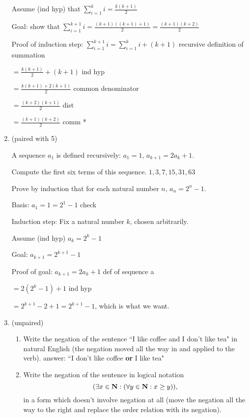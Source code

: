 \documentclass[12pt]{article}
\begin{document}
\begin{enumerate}
{Assume (ind hyp) that $\sum_{i=1}^k i = \frac{k(k+1)}2$

Goal:  show that $\sum_{i=1}^{k+1} i = \frac{(k+1)((k+1)+1)}2 = \frac{(k+1)(k+2)}2$

Proof of induction step:  $\sum_{i=1}^{k+1} i = \sum_{i=1}^{k} i +(k+1)$  recursive definition of summation

$= \frac{k(k+1)}2 + (k+1)$  ind hyp

$= \frac{k(k+1)+ 2(k+1)}2$ common denominator

$= \frac{(k+2)(k+1)}2$  dist

$= \frac{(k+1)(k+2)}2$  comm *}



\item (paired with 5)   

A sequence $a_1$ is defined recursively:  $a_1=1$, $a_{k+1} = 2a_k+1$.  

Compute the first six terms of this sequence.  $1, 3, 7, 15, 31, 63$

Prove by induction that for each natural number $n$, $a_n = 2^n-1$.

Basis:  $a_1 = 1 = 2^1-1$ check

Induction step:  Fix a natural number $k$, chosen arbitrarily.

Assume (ind hyp)  $a_k = 2^k -1$

Goal: $a_{k+1} = 2^{k+1} -1$

Proof of goal:  $a_{k+1} = 2a_k +1$  def of sequence a

$= 2(2^k-1)+1$ ind hyp

$= 2^{k+1}-2+1 = 2^{k+1}-1$, which is what we want.



\item (unpaired)

\begin{enumerate}

\item  Write the negation of the sentence ``I like coffee and I don't like tea" in natural English (the negation moved all the way in and applied to the verb).  answer:  ``I don't like coffee {\bf or} I like tea"

\item  Write the negation of the sentence in logical notation $$(\exists x \in {\bf N}:(\forall y \in {\bf N}: x \geq y)),$$ in a form which doesn't involve negation at all (move the negation all the way to the right and replace the order relation with its negation).


\end{enumerate}
\end{enumerate}
\end{document}
